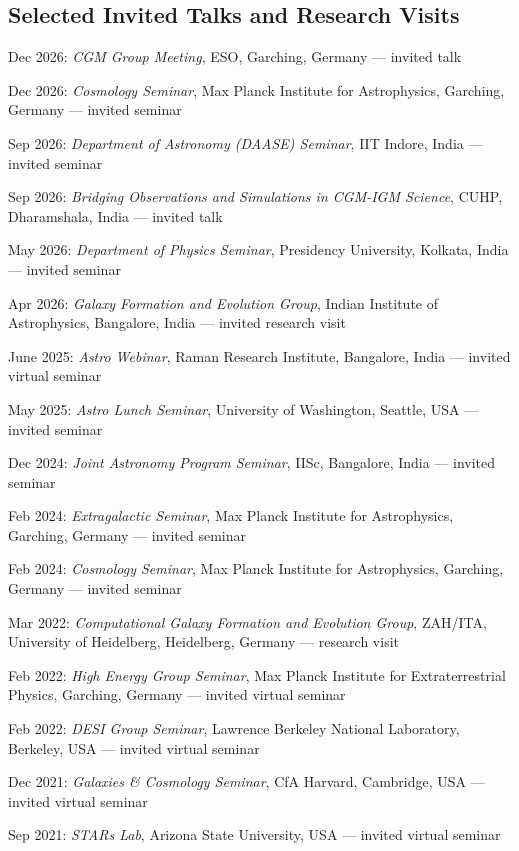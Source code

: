 \documentclass[11pt,letterpaper]{article}
\begin{document}
\subsection{Selected Invited Talks and Research Visits}
\vspace{-1mm}
\begin{list}{}{\cvlist}
\item Dec 2026: \emph{CGM Group Meeting}, ESO, Garching, Germany --- invited talk
\item Dec 2026: \emph{Cosmology Seminar}, Max Planck Institute for Astrophysics, Garching, Germany --- invited seminar
\item Sep 2026: \emph{Department of Astronomy (DAASE) Seminar}, IIT Indore, India --- invited seminar
\item Sep 2026: \emph{Bridging Observations and Simulations in CGM-IGM Science}, CUHP, Dharamshala, India --- invited talk
\item May 2026: \emph{Department of Physics Seminar}, Presidency University, Kolkata, India --- invited seminar
\item Apr 2026: \emph{Galaxy Formation and Evolution Group}, Indian Institute of Astrophysics, Bangalore, India --- invited research visit
\item June 2025: \emph{Astro Webinar}, Raman Research Institute, Bangalore, India --- invited virtual seminar
\item May 2025: \emph{Astro Lunch Seminar}, University of Washington, Seattle, USA --- invited seminar
\item Dec 2024: \emph{Joint Astronomy Program Seminar}, IISc, Bangalore, India --- invited seminar
\item Feb 2024: \emph{Extragalactic Seminar}, Max Planck Institute for Astrophysics, Garching, Germany --- invited seminar
\item Feb 2024: \emph{Cosmology Seminar}, Max Planck Institute for Astrophysics, Garching, Germany --- invited seminar
\item Mar 2022: \emph{Computational Galaxy Formation and Evolution Group}, ZAH/ITA, University of Heidelberg, Heidelberg, Germany --- research visit
\item Feb 2022: \emph{High Energy Group Seminar}, Max Planck Institute for Extraterrestrial Physics, Garching, Germany --- invited virtual seminar
\item Feb 2022: \emph{DESI Group Seminar}, Lawrence Berkeley National Laboratory, Berkeley, USA --- invited virtual seminar
\item Dec 2021: \emph{Galaxies \& Cosmology Seminar}, CfA Harvard, Cambridge, USA --- invited virtual seminar
\item Sep 2021: \emph{STARs Lab}, Arizona State University, USA --- invited virtual seminar
\end{list}
\end{document}
